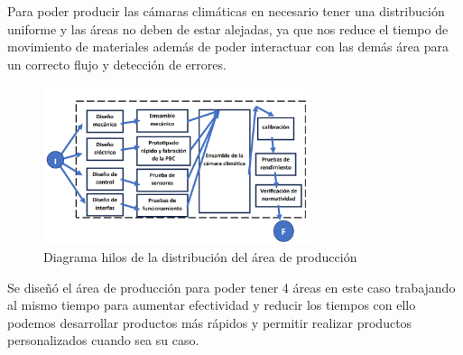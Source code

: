 Para poder producir las cámaras climáticas en necesario tener una distribución uniforme y las áreas no deben de estar alejadas, ya que nos reduce el tiempo de movimiento de materiales además de poder interactuar con las demás área para un correcto flujo y detección de errores.

\begin{figure}[H]
    \centering	
    \includegraphics[angle=0,width=0.70\textwidth]{chapters/ELC_DIAGRAM2.png} 
    \caption{Diagrama hilos de la distribución del área de producción}
\label{fig:croquis190125}
\end{figure}

Se diseñó el área de producción para poder tener 4 áreas en este caso trabajando al mismo tiempo para aumentar efectividad y reducir los tiempos con ello podemos desarrollar productos más rápidos y permitir realizar productos personalizados cuando sea su caso. 

